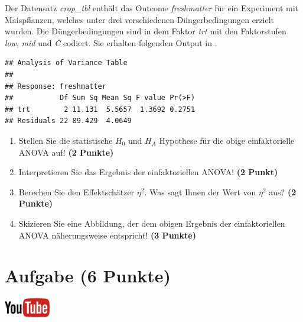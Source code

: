 \documentclass[a4paper, 10pt]{scrartcl}\usepackage[]{graphicx}\usepackage[]{xcolor}
\makeatletter
\newenvironment{kframe}{%
 \def\at@end@of@kframe{}%
 \ifinner\ifhmode%
  \def\at@end@of@kframe{\end{minipage}}%
  \begin{minipage}{\columnwidth}%
 \fi\fi%
 \def\FrameCommand##1{\hskip\@totalleftmargin \hskip-\fboxsep
 \colorbox{shadecolor}{##1}\hskip-\fboxsep
     \hskip-\linewidth \hskip-\@totalleftmargin \hskip\columnwidth}%
 \MakeFramed {\advance\hsize-\width
   \@totalleftmargin\z@ \linewidth\hsize
   \@setminipage}}%
 {\par\unskip\endMakeFramed%
 \at@end@of@kframe}
\newenvironment{knitrout}{}{} %
\makeatother
\begin{document}
Der Datensatz \textit{crop\_tbl} enth{\"a}lt das Outcome \textit{freshmatter} f{\"u}r ein Experiment mit 
Maispflanzen, welches unter drei 
verschiedenen D{\"u}ngerbedingungen erzielt wurden. Die D{\"u}ngerbedingungen sind in dem Faktor
\textit{trt} mit den Faktorstufen \textit{low},  \textit{mid} und
 \textit{C} codiert. Sie erhalten folgenden Output in \Rlogo.

\begin{knitrout}
\color{fgcolor}\begin{kframe}
\begin{verbatim}
## Analysis of Variance Table
## 
## Response: freshmatter
##           Df Sum Sq Mean Sq F value Pr(>F)
## trt        2 11.131  5.5657  1.3692 0.2751
## Residuals 22 89.429  4.0649
\end{verbatim}
\end{kframe}
\end{knitrout}

\begin{enumerate}
\item Stellen Sie die statistische $H_0$ und $H_A$ Hypothese f{\"u}r die obige
  einfaktorielle ANOVA auf! \textbf{(2 Punkte)}
\item Interpretieren Sie das Ergebnis der einfaktoriellen ANOVA! \textbf{(2 Punkt)} 
\item Berechen Sie den Effektsch{\"a}tzer $\eta^2$. Was sagt Ihnen der Wert von
  $\eta^2$ aus? \textbf{(2 Punkte)}
\item Skizieren Sie eine Abbildung, der dem obigen Ergebnis der
  einfaktoriellen ANOVA n{\"a}herungsweise entspricht! \textbf{(3 Punkte)}
\end{enumerate}

 
\clearpage

\section{Aufgabe \hfill (6 Punkte)}

\hfill\href{https://youtu.be/zDK2dhgtFt0}{\includegraphics[width =
  2cm]{img/youtube}}\\[1Ex]
\end{document}
